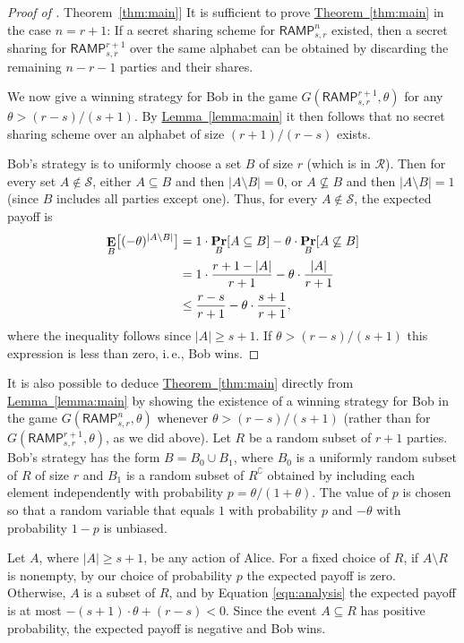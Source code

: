 \documentclass[11pt]{article}
\numberwithin{equation}{section}
\theoremstyle{definition}
\theoremstyle{plain}
\newcommand{\ie}{i.\,e.}
\newcommand{\expref}[2]{\hyperref[#2]{#1~\ref{#2}}}
\DeclareMathOperator\pr{\mathop{\bf Pr}}
\DeclareMathOperator\E{\mathop{\bf E}}
\newcommand{\ramp}[2]{\mathsf{RAMP}_{#1}^{#2}}
\def\calS{\mathcal{S}}
\def\calR{\mathcal{R}}
\providecommand\abs[1]{\lvert#1\rvert}
\providecommand\compl[1]{#1^{\complement}}
\begin{document}
\begin{proof}[Proof of \expref{Theorem}{thm:main}]
	It is sufficient to prove \expref{Theorem}{thm:main} in the case $n = r + 1$:  If a secret sharing scheme for $\ramp{s, r}{n}$ existed, then a secret sharing for $\ramp{s, r}{r + 1} $ over the same alphabet can be obtained by discarding the remaining $n - r - 1$ parties and their shares.
	
	We now give a winning strategy for Bob in the game $G(\ramp{s, r}{r + 1}, \theta)$ for any $\theta > (r - s)/(s + 1)$.  By \expref{Lemma}{lemma:main} it then follows that no secret sharing scheme over an alphabet of size $(r + 1)/(r - s)$ exists.
	
	Bob's strategy is to uniformly choose a set $B$ of size $r$ (which is in $\calR$).  Then for every set $A \not\in \calS$, either $A \subseteq B$ and then $\abs{A\setminus B} = 0$, or
	$A\not\subseteq B$ and then $\abs{A\setminus B} = 1$ (since $B$ includes all
	parties except one). Thus, for every $A\not\in \calS$, the expected payoff is
	\begin{align}
	\label{eqn:analysis}
	\E_B\bigl[(-\theta)^{\abs{A \setminus B}}\bigr] 
	&= 1 \cdot \pr_B[A \subseteq B] - \theta \cdot \pr_B[A \not\subseteq B] \notag \\
	&= 1 \cdot \frac{r + 1 - \abs{A}}{r + 1} - \theta \cdot \frac{\abs{A}}{r + 1} \notag \\
	&\leq \frac{r - s}{r + 1} - \theta \cdot \frac{s + 1}{r + 1},
	\end{align}
	where the inequality follows since $\abs{A} \geq s+1$.  If $\theta > (r - s)/(s + 1)$ this expression is less than zero, \ie, Bob wins.
\end{proof}

It is also possible to deduce \expref{Theorem}{thm:main} directly from
\expref{Lemma}{lemma:main} by showing the existence of a winning strategy for Bob in
the game $G(\ramp{s, r}{n}, \theta)$ whenever $\theta > (r - s)/(s + 1)$ (rather
than for $G(\ramp{s, r}{r+1}, \theta)$, as we did above).  Let $R$ be a random subset of $r + 1$ parties.  Bob's strategy has the form $B = B_0 \cup B_1$, where $B_0$ is a uniformly random subset of $R$ of size $r$ and $B_1$ is a random subset of $\compl{R}$ obtained by including each element independently with probability $p = \theta/(1 + \theta)$.  The value of $p$ is chosen so that a random variable that equals $1$ with probability $p$ and $-\theta$ with probability $1 - p$ is unbiased.

Let $A$, where $\abs{A} \geq s + 1$, be any action of Alice.  For a fixed choice
of $R$, if $A \setminus R$ is nonempty, by our choice of probability $p$ the
expected payoff is zero.  Otherwise, $A$ is a subset of $R$, and by Equation \eqref{eqn:analysis} the expected payoff is at most $-(s + 1) \cdot \theta + (r - s) < 0$.  Since the event $A \subseteq R$ has positive probability, the expected payoff is negative and Bob wins.
\end{document}
